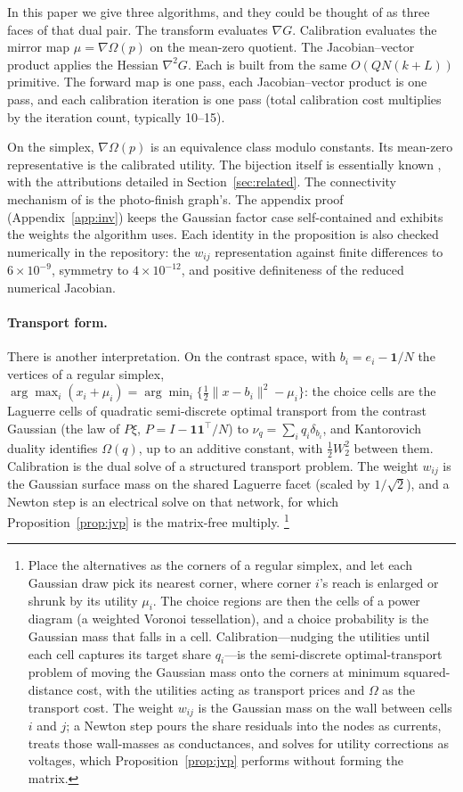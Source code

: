 \documentclass[12pt]{article}
\theoremstyle{remark}
\begin{document}
In this paper we give three
algorithms, and they could be thought of as three faces of that dual
pair. The transform evaluates $\nabla G$. Calibration evaluates the
mirror map $\mu = \nabla\Omega(p)$ on the mean-zero quotient. The
Jacobian--vector product applies the Hessian $\nabla^2 G$. Each is
built from the same $O(QN(k+L))$ primitive. The forward map is one
pass, each Jacobian--vector product is one pass, and each calibration
iteration is one pass (total calibration cost multiplies by the
iteration count, typically 10--15). 

On the simplex, $\nabla\Omega(p)$ is an equivalence
class modulo constants. Its mean-zero representative is the calibrated
utility. The bijection itself is essentially known
\citep{hotz1993,norets2013,bgh2013}, with the attributions detailed in
Section~\ref{sec:related}. The connectivity mechanism of
\citet{bgh2013} is the photo-finish graph's. The appendix proof (Appendix~\ref{app:inv}) keeps the
Gaussian factor case self-contained and exhibits the weights the algorithm uses. Each
identity in the proposition is also checked
numerically in the repository: the $w_{ij}$ representation against finite
differences to $6\times10^{-9}$, symmetry to $4\times10^{-12}$, and
positive definiteness of the reduced numerical Jacobian.


\paragraph{Transport form.}

There is another interpretation. On the contrast space, with $b_i = e_i - \mathbf{1}/N$ the vertices of
a regular simplex, $\arg\max_i (x_i + \mu_i) = \arg\min_i
\{\tfrac12 \|x - b_i\|^2 - \mu_i\}$: the choice cells are the
Laguerre cells of quadratic semi-discrete optimal transport from the
contrast Gaussian (the law of $P\xi$, $P = I - \mathbf{1}\mathbf{1}^\top/N$) to $\nu_q = \sum_i q_i \delta_{b_i}$, and
Kantorovich duality identifies $\Omega(q)$, up to an additive constant,
with $\tfrac12 W_2^2$ between them. Calibration is the dual solve of a
structured transport problem. The weight $w_{ij}$ is the Gaussian surface
mass on the shared Laguerre facet (scaled by $1/\sqrt2$), and a Newton step is
an electrical solve on that network, for which
Proposition~\ref{prop:jvp} is the matrix-free multiply.%
\footnote{Place the alternatives as the corners of a
regular simplex, and let each Gaussian draw pick its nearest corner,
where corner $i$'s reach is enlarged or shrunk by its utility $\mu_i$.
The choice regions are then the cells of a power diagram (a weighted
Voronoi tessellation), and a choice probability is the Gaussian mass
that falls in a cell. Calibration---nudging the utilities until each
cell captures its target share $q_i$---is the semi-discrete
optimal-transport problem of moving the Gaussian mass onto the corners
at minimum squared-distance cost, with the utilities acting as transport
prices and $\Omega$ as the transport cost. The weight $w_{ij}$ is the
Gaussian mass on the wall between cells $i$ and $j$; a Newton step pours
the share residuals into the nodes as currents, treats those
wall-masses as conductances, and solves for utility corrections as
voltages, which Proposition~\ref{prop:jvp} performs without forming the
matrix.}
\end{document}
